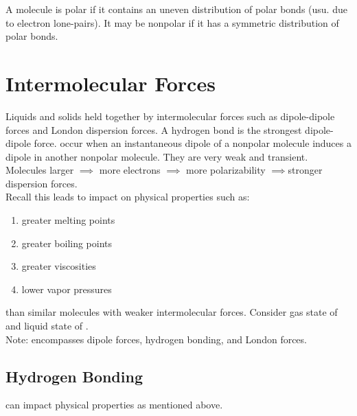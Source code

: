 \documentclass[../GChemReview.tex]{subfiles}
\begin{document}
  A molecule is polar if it contains an uneven distribution of polar bonds (usu.
  due to electron lone-pairs). It may be nonpolar if it has a symmetric
  distribution of polar bonds.

  \section{Intermolecular Forces}

  Liquids and solids held together by intermolecular forces such as
  dipole-dipole forces and London dispersion forces. A hydrogen bond is the
  strongest dipole-dipole force.  occur when
  an instantaneous dipole of a nonpolar molecule induces a dipole in another
  nonpolar molecule. They are very weak and transient. Molecules larger $
  \implies $ more electrons $ \implies $ more polarizability $ \implies
  $stronger dispersion forces.\\
  Recall this leads to impact on physical properties such as:
  \begin{enumerate}
    \item greater melting points
    \item greater boiling points
    \item greater viscosities
    \item lower vapor pressures
  \end{enumerate}	
  than similar molecules with weaker intermolecular forces. Consider gas state
  of  and liquid state of .\\ Note:  encompasses dipole forces, hydrogen bonding, and London
  forces.

  \subsection{Hydrogen Bonding}


  can impact physical properties as mentioned above.
\end{document}
